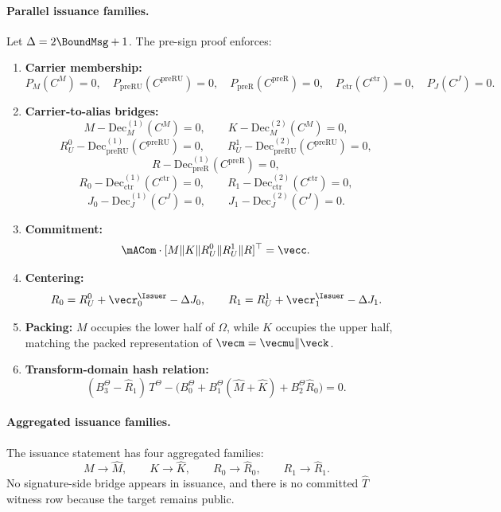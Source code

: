 \paragraph{Parallel issuance families.}
Let \(\Delta=2\BoundMsg+1\). The pre-sign proof enforces:
\begin{enumerate}[leftmargin=1.25em]
  \item \textbf{Carrier membership:}
  \[
    P_M(C^M)=0,\quad
    P_{\mathrm{preRU}}(C^{\mathrm{preRU}})=0,\quad
    P_{\mathrm{preR}}(C^{\mathrm{preR}})=0,\quad
    P_{\mathrm{ctr}}(C^{\mathrm{ctr}})=0,\quad
    P_J(C^J)=0.
  \]
  \item \textbf{Carrier-to-alias bridges:}
  \[
    M-\mathrm{Dec}_M^{(1)}(C^M)=0,\qquad
    K-\mathrm{Dec}_M^{(2)}(C^M)=0,
  \]
  \[
    R_U^0-\mathrm{Dec}_{\mathrm{preRU}}^{(1)}(C^{\mathrm{preRU}})=0,\qquad
    R_U^1-\mathrm{Dec}_{\mathrm{preRU}}^{(2)}(C^{\mathrm{preRU}})=0,
  \]
  \[
    R-\mathrm{Dec}_{\mathrm{preR}}^{(1)}(C^{\mathrm{preR}})=0,
  \]
  \[
    R_0-\mathrm{Dec}_{\mathrm{ctr}}^{(1)}(C^{\mathrm{ctr}})=0,\qquad
    R_1-\mathrm{Dec}_{\mathrm{ctr}}^{(2)}(C^{\mathrm{ctr}})=0,
  \]
  \[
    J_0-\mathrm{Dec}_J^{(1)}(C^J)=0,\qquad
    J_1-\mathrm{Dec}_J^{(2)}(C^J)=0.
  \]
  \item \textbf{Commitment:}
  \[
    \mACom\cdot[M\Vert K\Vert R_U^0\Vert R_U^1\Vert R]^\top=\vecc.
  \]
  \item \textbf{Centering:}
  \[
    R_0 = R_U^0 + \vecr_0^{\Issuer} - \Delta J_0,\qquad
    R_1 = R_U^1 + \vecr_1^{\Issuer} - \Delta J_1.
  \]
  \item \textbf{Packing:}
  \(M\) occupies the lower half of \(\Omega\), while \(K\) occupies the upper
  half, matching the packed representation of
  \(\vecm=\vecmu\Vert\veck\).
  \item \textbf{Transform-domain hash relation:}
  \[
    (B_3^\Theta-\widehat R_1)\,T^\Theta
    -\bigl(B_0^\Theta + B_1^\Theta(\widehat M+\widehat K)
    + B_2^\Theta\widehat R_0\bigr)=0.
  \]
\end{enumerate}

\paragraph{Aggregated issuance families.}
The issuance statement has four aggregated families:
\[
  M\rightarrow \widehat M,\qquad
  K\rightarrow \widehat K,\qquad
  R_0\rightarrow \widehat R_0,\qquad
  R_1\rightarrow \widehat R_1.
\]
No signature-side bridge appears in issuance, and there is no committed
\(\widehat T\) witness row because the target remains public.

